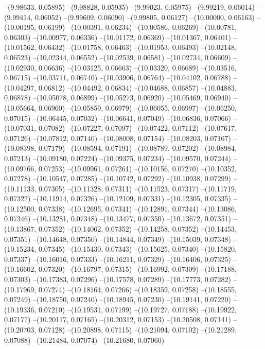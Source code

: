--(9.98633, 0.05895)
--(9.98828, 0.05935)
--(9.99023, 0.05975)
--(9.99219, 0.06014)
--(9.99414, 0.06052)
--(9.99609, 0.06090)
--(9.99805, 0.06127)
--(10.00000, 0.06163)
--(10.00195, 0.06199)
--(10.00391, 0.06234)
--(10.00586, 0.06269)
--(10.00781, 0.06303)
--(10.00977, 0.06336)
--(10.01172, 0.06369)
--(10.01367, 0.06401)
--(10.01562, 0.06432)
--(10.01758, 0.06463)
--(10.01953, 0.06493)
--(10.02148, 0.06523)
--(10.02344, 0.06552)
--(10.02539, 0.06581)
--(10.02734, 0.06609)
--(10.02930, 0.06636)
--(10.03125, 0.06663)
--(10.03320, 0.06689)
--(10.03516, 0.06715)
--(10.03711, 0.06740)
--(10.03906, 0.06764)
--(10.04102, 0.06788)
--(10.04297, 0.06812)
--(10.04492, 0.06834)
--(10.04688, 0.06857)
--(10.04883, 0.06878)
--(10.05078, 0.06899)
--(10.05273, 0.06920)
--(10.05469, 0.06940)
--(10.05664, 0.06960)
--(10.05859, 0.06979)
--(10.06055, 0.06997)
--(10.06250, 0.07015)
--(10.06445, 0.07032)
--(10.06641, 0.07049)
--(10.06836, 0.07066)
--(10.07031, 0.07082)
--(10.07227, 0.07097)
--(10.07422, 0.07112)
--(10.07617, 0.07126)
--(10.07812, 0.07140)
--(10.08008, 0.07154)
--(10.08203, 0.07167)
--(10.08398, 0.07179)
--(10.08594, 0.07191)
--(10.08789, 0.07202)
--(10.08984, 0.07213)
--(10.09180, 0.07224)
--(10.09375, 0.07234)
--(10.09570, 0.07244)
--(10.09766, 0.07253)
--(10.09961, 0.07261)
--(10.10156, 0.07270)
--(10.10352, 0.07278)
--(10.10547, 0.07285)
--(10.10742, 0.07292)
--(10.10938, 0.07299)
--(10.11133, 0.07305)
--(10.11328, 0.07311)
--(10.11523, 0.07317)
--(10.11719, 0.07322)
--(10.11914, 0.07326)
--(10.12109, 0.07331)
--(10.12305, 0.07335)
--(10.12500, 0.07338)
--(10.12695, 0.07341)
--(10.12891, 0.07344)
--(10.13086, 0.07346)
--(10.13281, 0.07348)
--(10.13477, 0.07350)
--(10.13672, 0.07351)
--(10.13867, 0.07352)
--(10.14062, 0.07352)
--(10.14258, 0.07352)
--(10.14453, 0.07351)
--(10.14648, 0.07350)
--(10.14844, 0.07349)
--(10.15039, 0.07348)
--(10.15234, 0.07345)
--(10.15430, 0.07343)
--(10.15625, 0.07340)
--(10.15820, 0.07337)
--(10.16016, 0.07333)
--(10.16211, 0.07329)
--(10.16406, 0.07325)
--(10.16602, 0.07320)
--(10.16797, 0.07315)
--(10.16992, 0.07309)
--(10.17188, 0.07303)
--(10.17383, 0.07296)
--(10.17578, 0.07289)
--(10.17773, 0.07282)
--(10.17969, 0.07274)
--(10.18164, 0.07266)
--(10.18359, 0.07258)
--(10.18555, 0.07249)
--(10.18750, 0.07240)
--(10.18945, 0.07230)
--(10.19141, 0.07220)
--(10.19336, 0.07210)
--(10.19531, 0.07199)
--(10.19727, 0.07188)
--(10.19922, 0.07177)
--(10.20117, 0.07165)
--(10.20312, 0.07153)
--(10.20508, 0.07141)
--(10.20703, 0.07128)
--(10.20898, 0.07115)
--(10.21094, 0.07102)
--(10.21289, 0.07088)
--(10.21484, 0.07074)
--(10.21680, 0.07060)
